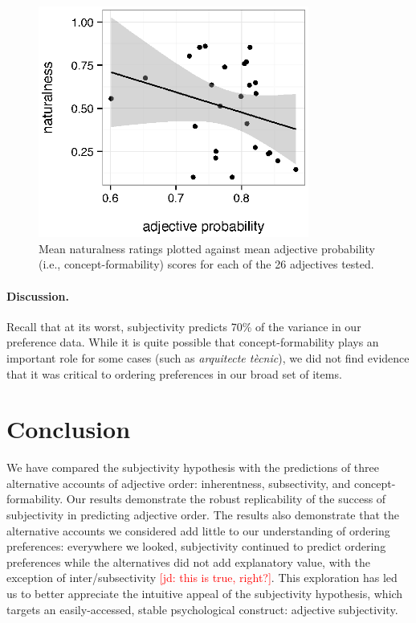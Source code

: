 \documentclass[12pt]{article}
\newcommand{\jd}[1]{\textcolor{red}{[jd: #1]}}
\begin{document}
\renewcommand\thefigure{S.\arabic{figure}}
\begin{figure}
	\centering\includegraphics[width=3.5in]{plots/naturalness-concept-adjective.eps}%
	\caption{Mean naturalness ratings plotted against mean adjective probability (i.e., concept-formability) scores for each of the 26 adjectives tested.}\label{fig:concept}
\end{figure}

\paragraph{Discussion.} Recall that at its worst, subjectivity predicts 70\% of the variance in our preference data. 
While it is quite possible that concept-formability plays an important role for some cases (such as \emph{arquitecte t\`{e}cnic}), we did not find evidence that it was critical to ordering preferences in our broad set of items. 

\section{Conclusion}

We have compared the subjectivity hypothesis with the predictions of three alternative accounts of adjective order: inherentness, subsectivity, and concept-formability. Our results demonstrate the robust replicability of the success of subjectivity in predicting adjective order. The results also demonstrate that the alternative accounts we considered add little to our understanding of ordering preferences: everywhere we looked, subjectivity continued to predict ordering preferences while the alternatives did not add explanatory value, with the exception of inter/subsectivity \jd{this is true, right?}. This exploration has led us to better appreciate the intuitive appeal of the subjectivity hypothesis, which targets an easily-accessed, stable psychological construct: adjective subjectivity.





 

\end{document}
